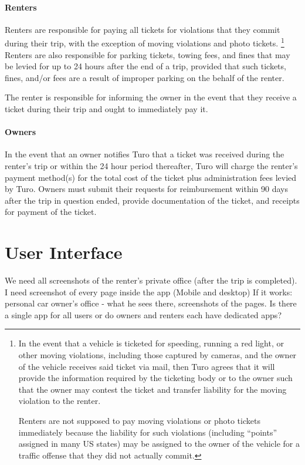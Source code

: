 \documentclass[review,12pt]{elsarticle}
\begin{document}
    \paragraph{Renters}
    Renters are responsible for paying all tickets for violations that they commit during their trip, with the exception of moving violations and photo tickets.
      \footnote{In the event that a vehicle is ticketed for speeding, running a red light, or other moving violations, including those captured by cameras, and the owner of the vehicle receives said ticket via mail, then Turo agrees that it will provide the information required by the ticketing body or to the owner such that the owner may contest the ticket and transfer liability for the moving violation to the renter.

      Renters are not supposed to pay moving violations or photo tickets immediately because the liability for such violations (including ``points'' assigned in many US states) may be assigned to the owner of the vehicle for a traffic offense that they did not actually commit.
      }
    Renters are also responsible for parking tickets, towing fees, and fines that may be levied for up to 24 hours after the end of a trip, provided that such tickets, fines, and/or fees are a result of improper parking on the behalf of the renter.

    The renter is responsible for informing the owner in the event that they receive a ticket during their trip and ought to immediately pay it.

    \paragraph{Owners}
    In the event that an owner notifies Turo that a ticket was received during the renter's trip or within the 24 hour period thereafter, Turo will charge the renter's payment method(s) for the total cost of the ticket plus administration fees levied by Turo. Owners must submit their requests for reimbursement within 90 days after the trip in question ended, provide documentation of the ticket, and receipts for payment of the ticket.

\section{User Interface}
We need all screenshots of the renter’s private office (after the trip is completed). I need screenshot of every page inside the app (Mobile and desktop)
If it works: personal car owner's office - what he sees there, screenshots of the pages.
Is there a single app for all users or do owners and renters each have dedicated apps?
\end{document}
